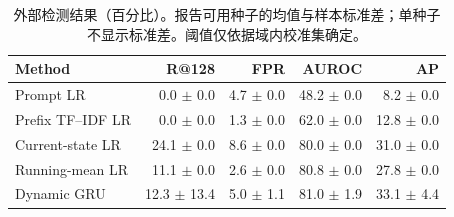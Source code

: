 \begin{table}[t]
\centering\footnotesize
\caption{外部检测结果（百分比）。报告可用种子的均值与样本标准差；单种子不显示标准差。阈值仅依据域内校准集确定。}\label{tab:external}
\begin{tabular}{lrrrr}\toprule
Method & R@128 & FPR & AUROC & AP \\
\midrule
Prompt LR & 0.0 $\pm$ 0.0 & 4.7 $\pm$ 0.0 & 48.2 $\pm$ 0.0 & 8.2 $\pm$ 0.0 \\
Prefix TF--IDF LR & 0.0 $\pm$ 0.0 & 1.3 $\pm$ 0.0 & 62.0 $\pm$ 0.0 & 12.8 $\pm$ 0.0 \\
Current-state LR & 24.1 $\pm$ 0.0 & 8.6 $\pm$ 0.0 & 80.0 $\pm$ 0.0 & 31.0 $\pm$ 0.0 \\
Running-mean LR & 11.1 $\pm$ 0.0 & 2.6 $\pm$ 0.0 & 80.8 $\pm$ 0.0 & 27.8 $\pm$ 0.0 \\
Dynamic GRU & 12.3 $\pm$ 13.4 & 5.0 $\pm$ 1.1 & 81.0 $\pm$ 1.9 & 33.1 $\pm$ 4.4 \\
\bottomrule\end{tabular}
\end{table}

